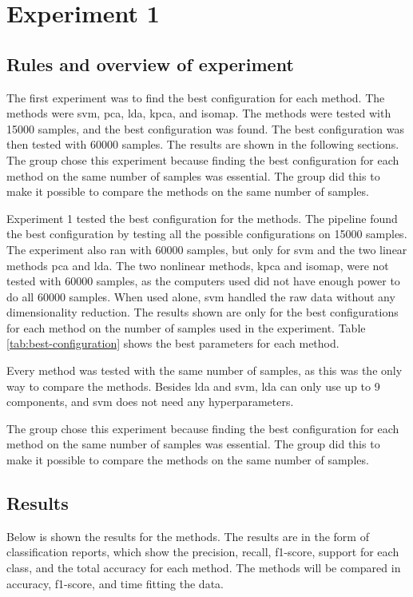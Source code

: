 \section{Experiment 1}\label{sec:experiment-1}


\subsection{Rules and overview of experiment}\label{subsec:experiment-1-rules}
The first experiment was to find the best configuration for each method. The methods were \gls{svm}, \gls{pca}, \gls{lda}, \gls{kpca}, and \gls{isomap}. The methods were tested with 15000 samples, and the best configuration was found. The best configuration was then tested with 60000 samples. The results are shown in the following sections. The group chose this experiment because finding the best configuration for each method on the same number of samples was essential. The group did this to make it possible to compare the methods on the same number of samples.

Experiment 1 tested the best configuration for the methods. The pipeline found the best configuration by testing all the possible configurations on 15000 samples. The experiment also ran with 60000 samples, but only for \gls{svm} and the two linear methods \gls{pca} and \gls{lda}. The two nonlinear methods, \gls{kpca} and \gls{isomap}, were not tested with 60000 samples, as the computers used did not have enough power to do all 60000 samples. When used alone, \gls{svm} handled the raw data without any dimensionality reduction. The results shown are only for the best configurations for each method on the number of samples used in the experiment. Table \ref{tab:best-configuration} shows the best parameters for each method.



Every method was tested with the same number of samples, as this was the only way to compare the methods. Besides \gls{lda} and \gls{svm}, \gls{lda} can only use up to 9 components, and \gls{svm} does not need any hyperparameters.

The group chose this experiment because finding the best configuration for each method on the same number of samples was essential. The group did this to make it possible to compare the methods on the same number of samples. 
\subsection{Results}\label{subsec:experiment-1-results}
Below is shown the results for the methods. The results are in the form of classification reports, which show the precision, recall, f1-score, support for each class, and the total accuracy for each method. The methods will be compared in accuracy, f1-score, and time fitting the data. 


